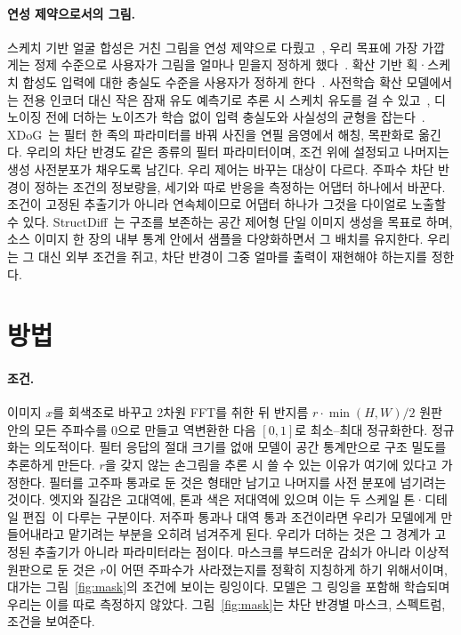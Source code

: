 \documentclass[10pt,twocolumn,a4paper]{article}
\begin{document}
\paragraph{연성 제약으로서의 그림.} 스케치 기반 얼굴 합성은 거친 그림을 연성 제약으로
다뤘고~\cite{chen2020deepfacedrawing}, 우리 목표에 가장 가깝게는 정제 수준으로 사용자가 그림을
얼마나 믿을지 정하게 했다~\cite{yang2020deep}. 확산 기반 획·스케치 합성도 입력에 대한
충실도 수준을 사용자가 정하게 한다~\cite{cheng2023adaptively}. 사전학습 확산 모델에서는 전용
인코더 대신 작은 잠재 유도 예측기로 추론 시 스케치 유도를 걸 수 있고~\cite{voynov2023sketch},
디노이징 전에 더하는 노이즈가 학습 없이 입력 충실도와 사실성의 균형을
잡는다~\cite{meng2022sdedit}. XDoG~\cite{winnemoller2012xdog}는 필터 한 족의
파라미터를 바꿔 사진을 연필 음영에서 해칭, 목판화로 옮긴다. 우리의 차단 반경도 같은 종류의
필터 파라미터이며, 조건 위에 설정되고 나머지는 생성 사전분포가 채우도록 남긴다. 우리 제어는
바꾸는 대상이 다르다. 주파수 차단 반경이 정하는 조건의 정보량을, 세기와 따로 반응을 측정하는 어댑터
하나에서 바꾼다. 조건이 고정된 추출기가 아니라 연속체이므로 어댑터 하나가 그것을 다이얼로
노출할 수 있다. StructDiff~\cite{he2026structdiff}는 구조를 보존하는 공간 제어형 단일
이미지 생성을 목표로 하며, 소스 이미지 한 장의 내부 통계 안에서 샘플을 다양화하면서 그
배치를 유지한다. 우리는 그 대신 외부 조건을 쥐고, 차단 반경이 그중 얼마를 출력이 재현해야
하는지를 정한다.

\section{방법}

\paragraph{조건.} 이미지 $x$를 회색조로 바꾸고 2차원 FFT를 취한 뒤 반지름
$r \cdot \min(H,W)/2$ 원판 안의 모든 주파수를 0으로 만들고 역변환한 다음 $[0,1]$로
최소--최대 정규화한다. 정규화는 의도적이다. 필터 응답의 절대 크기를 없애 모델이 공간
통계만으로 구조 밀도를 추론하게 만든다. $r$을 갖지 않는 손그림을 추론 시 쓸 수 있는
이유가 여기에 있다고 가정한다. 필터를 고주파 통과로 둔 것은 형태만 남기고 나머지를 사전
분포에 넘기려는 것이다. 엣지와 질감은 고대역에, 톤과 색은 저대역에 있으며 이는 두 스케일
톤·디테일 편집~\cite{bae2006two,farbman2008edge}이 다루는 구분이다. 저주파 통과나 대역 통과
조건이라면 우리가 모델에게 만들어내라고 맡기려는 부분을 오히려 넘겨주게 된다. 우리가 더하는
것은 그 경계가 고정된 추출기가 아니라 파라미터라는 점이다. 마스크를 부드러운 감쇠가 아니라
이상적 원판으로 둔 것은 $r$이 어떤 주파수가 사라졌는지를 정확히 지칭하게 하기 위해서이며,
대가는 그림~\ref{fig:mask}의 조건에 보이는 링잉이다. 모델은 그 링잉을 포함해 학습되며 우리는
이를 따로 측정하지 않았다. 그림~\ref{fig:mask}는 차단 반경별 마스크, 스펙트럼, 조건을
보여준다.
\end{document}
